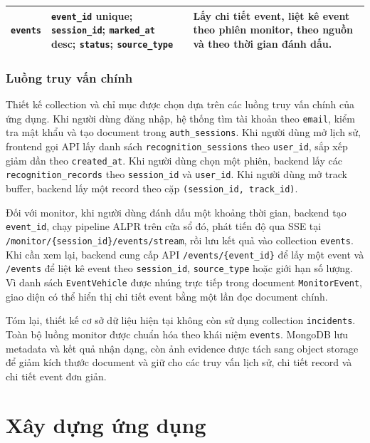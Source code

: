 \documentclass[../DoAn.tex]{subfiles}
\begin{document}
\begin{table}[htbp]
\begin{tabular}{|>{\raggedright\arraybackslash}p{3.4cm}|>{\raggedright\arraybackslash}p{5.6cm}|>{\raggedright\arraybackslash}p{5.4cm}|}
\hline
\texttt{events} & \texttt{event\_id} unique; \newline \texttt{session\_id}; \newline \texttt{marked\_at} desc; \newline \texttt{status}; \newline \texttt{source\_type} & Lấy chi tiết event, liệt kê event theo phiên monitor, theo nguồn và theo thời gian đánh dấu. \\
\hline
\end{tabular}
\end{table}

\subsubsection{Luồng truy vấn chính}

Thiết kế collection và chỉ mục được chọn dựa trên các luồng truy vấn chính của ứng dụng. Khi người dùng đăng nhập, hệ thống tìm tài khoản theo \texttt{email}, kiểm tra mật khẩu và tạo document trong \texttt{auth\_sessions}. Khi người dùng mở lịch sử, frontend gọi API lấy danh sách \texttt{recognition\_sessions} theo \texttt{user\_id}, sắp xếp giảm dần theo \texttt{created\_at}. Khi người dùng chọn một phiên, backend lấy các \texttt{recognition\_records} theo \texttt{session\_id} và \texttt{user\_id}. Khi người dùng mở track buffer, backend lấy một record theo cặp \texttt{(session\_id, track\_id)}.

Đối với monitor, khi người dùng đánh dấu một khoảng thời gian, backend tạo \texttt{event\_id}, chạy pipeline ALPR trên cửa sổ đó, phát tiến độ qua SSE tại \texttt{/monitor/\{session\_id\}/events/stream}, rồi lưu kết quả vào collection \texttt{events}. Khi cần xem lại, backend cung cấp API \texttt{/events/\{event\_id\}} để lấy một event và \texttt{/events} để liệt kê event theo \texttt{session\_id}, \texttt{source\_type} hoặc giới hạn số lượng. Vì danh sách \texttt{EventVehicle} được nhúng trực tiếp trong document \texttt{MonitorEvent}, giao diện có thể hiển thị chi tiết event bằng một lần đọc document chính.

Tóm lại, thiết kế cơ sở dữ liệu hiện tại không còn sử dụng collection \texttt{incidents}. Toàn bộ luồng monitor được chuẩn hóa theo khái niệm \texttt{events}. MongoDB lưu metadata và kết quả nhận dạng, còn ảnh evidence được tách sang object storage để giảm kích thước document và giữ cho các truy vấn lịch sử, chi tiết record và chi tiết event đơn giản.


\section{Xây dựng ứng dụng}
\end{document}
